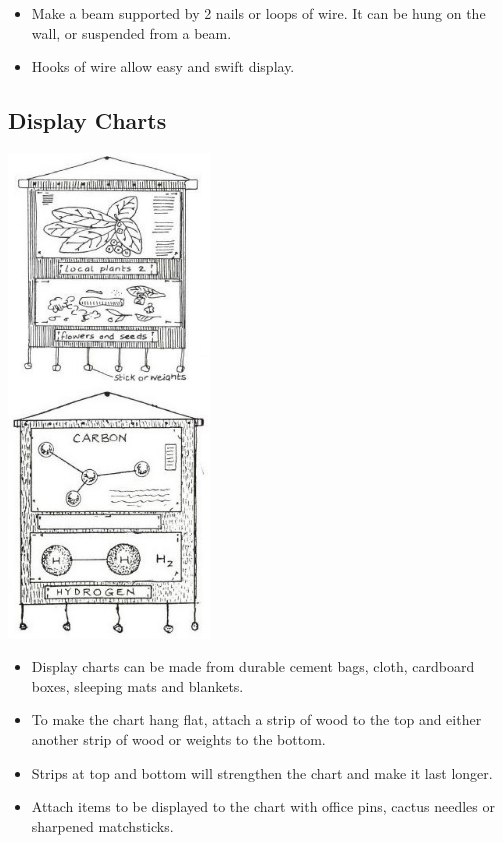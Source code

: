 \begin{multicols}{2}
\begin{itemize}
\item Make a beam supported by 2 nails or loops of wire.
It can be hung on the wall, or suspended from a beam.
\item Hooks of wire allow easy and swift display.
\end{itemize}

\subsection{Display Charts}

\begin{center}
\includegraphics[width=0.4\textwidth]{./img/vso/display-charts-alt.jpg}
\end{center}

\begin{itemize}
\item Display charts can be made
from durable cement bags,
cloth, cardboard boxes, sleeping
mats and blankets.
\item To make the chart hang flat,
attach a strip of wood to the
top and either another strip of
wood or weights to the bottom.
\item Strips at top and bottom will
strengthen the chart and make
it last longer.
\item Attach items to be displayed to
the chart with office pins, cactus
needles or sharpened
matchsticks.
\end{itemize}


\end{multicols}
